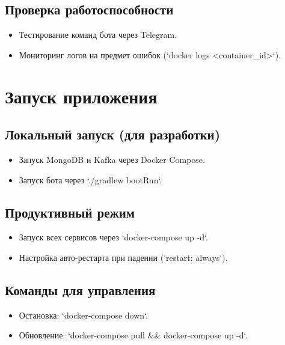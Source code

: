 \documentclass[areasetadvanced]{scrartcl}
\begin{document}
\subsection{Проверка работоспособности}
\begin{itemize}
    \item Тестирование команд бота через Telegram.
    \item Мониторинг логов на предмет ошибок (`docker logs <container\_id>`).
\end{itemize}

\section{Запуск приложения}

\subsection{Локальный запуск (для разработки)}
\begin{itemize}
    \item Запуск MongoDB и Kafka через Docker Compose.
    \item Запуск бота через `./gradlew bootRun`.
\end{itemize}

\subsection{Продуктивный режим}
\begin{itemize}
    \item Запуск всех сервисов через `docker-compose up -d`.
    \item Настройка авто-рестарта при падении (`restart: always`).
\end{itemize}

\subsection{Команды для управления}
\begin{itemize}
    \item Остановка: `docker-compose down`.
    \item Обновление: `docker-compose pull \&\& docker-compose up -d`.
\end{itemize}
\end{document}
